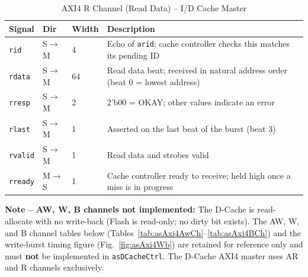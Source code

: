 \begin{table}[H]
\caption{AXI4 R Channel (Read Data) -- I/D Cache Master}
\label{tab:asAxi4RCh}
\centering
\begin{tabularx}{\textwidth}{|l |l |l |X|}
  \hline
  Signal & Dir & Width & Description \\
  \hline
  \hline
  \texttt{rid}    & S$\to$M & 4  & Echo of \texttt{arid}; cache controller checks this matches its pending ID \\
  \hline
  \texttt{rdata}  & S$\to$M & 64 & Read data beat; received in natural address order (beat 0 = lowest address) \\
  \hline
  \texttt{rresp}  & S$\to$M & 2  & 2'b00 = OKAY; other values indicate an error \\
  \hline
  \texttt{rlast}  & S$\to$M & 1  & Asserted on the last beat of the burst (beat 3) \\
  \hline
  \texttt{rvalid} & S$\to$M & 1  & Read data and strobes valid \\
  \hline
  \texttt{rready} & M$\to$S & 1  & Cache controller ready to receive; held high once a miss is in progress \\
  \hline
\end{tabularx}
\end{table}

\textbf{Note -- AW, W, B channels not implemented:}
The D-Cache is read-allocate with no write-back (Flash is read-only; no dirty bit exists).
The AW, W, and B channel tables below (Tables~\ref{tab:asAxi4AwCh}--\ref{tab:asAxi4BCh})
and the write-burst timing figure (Fig.~\ref{fig:asAxi4Wb}) are retained for
reference only and must \textbf{not} be implemented in \texttt{asDCacheCtrl}.
The D-Cache AXI4 master uses AR and R channels exclusively.

